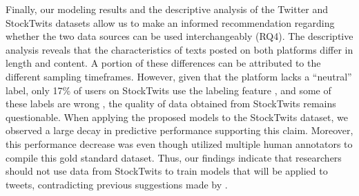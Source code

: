Finally, our modeling results and the descriptive analysis of the Twitter and StockTwits datasets allow us to make an informed recommendation regarding whether the two data sources can be used interchangeably (RQ4). The descriptive analysis reveals that the characteristics of texts posted on both platforms differ in length and content. A portion of these differences can be attributed to the different sampling timeframes. However, given that the platform lacks a ``neutral'' label, only 17\% of users on StockTwits use the labeling feature , and some of these labels are wrong , the quality of data obtained from StockTwits remains questionable. When applying the proposed models to the StockTwits dataset, we observed a large decay in predictive performance supporting this claim. Moreover, this performance decrease was even though  utilized multiple human annotators to compile this gold standard dataset. Thus, our findings indicate that researchers should not use data from StockTwits to train models that will be applied to tweets, contradicting previous suggestions made by .

